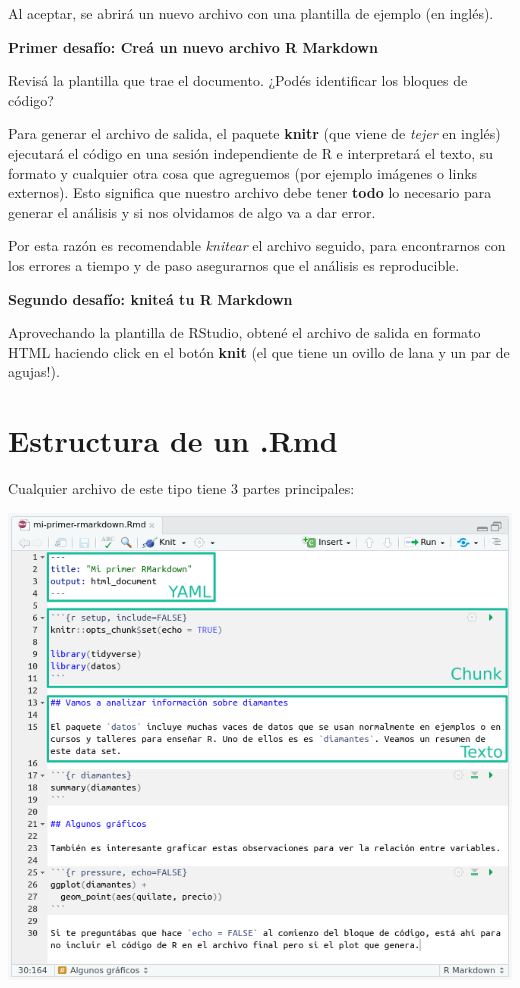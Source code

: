 \documentclass[
  openany]{book}
\begin{document}
Al aceptar, se abrirá un nuevo archivo con una plantilla de ejemplo (en inglés).

\textbf{Primer desafío: Creá un nuevo archivo R Markdown}

Revisá la plantilla que trae el documento.
¿Podés identificar los bloques de código?

Para generar el archivo de salida, el paquete \textbf{knitr} (que viene de \emph{tejer} en inglés) ejecutará el código en una sesión independiente de R e interpretará el texto, su formato y cualquier otra cosa que agreguemos (por ejemplo imágenes o links externos).
Esto significa que nuestro archivo debe tener \textbf{todo} lo necesario para generar el análisis y si nos olvidamos de algo va a dar error.

Por esta razón es recomendable \emph{knitear} el archivo seguido, para encontrarnos con los errores a tiempo y de paso asegurarnos que el análisis es reproducible.

\textbf{Segundo desafío: kniteá tu R Markdown}

Aprovechando la plantilla de RStudio, obtené el archivo de salida en formato HTML haciendo click en el botón \textbf{knit} (el que tiene un ovillo de lana y un par de agujas!).

\hypertarget{estructura-de-un-.rmd}{%
\section{Estructura de un .Rmd}\label{estructura-de-un-.rmd}}

Cualquier archivo de este tipo tiene 3 partes principales:

\includegraphics{img/rmd-ejemplo-secciones.png}
\end{document}
